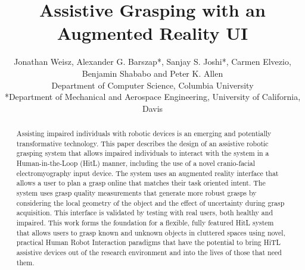\documentclass[10pt, journal]{IEEEtran}
\begin{document}

\title{Assistive Grasping with an Augmented Reality UI}




\author{Jonathan Weisz, Alexander G. Barszap*, Sanjay S. Joshi*, Carmen Elvezio, Benjamin Shababo and Peter K. Allen\\
Department of Computer Science, Columbia University\\
*Department of Mechanical and Aerospace Engineering, University of California, Davis}



\maketitle

\begin{abstract}
Assisting impaired individuals with robotic devices is an emerging and potentially transformative technology.  This paper describes the design of an assistive robotic grasping system that allows impaired individuals to interact with the system in a Human-in-the-Loop (HitL) manner, including the use of a novel cranio-facial electromyography input device. The system uses an augmented reality interface that allows a user to plan a grasp online that matches their task oriented intent. The system uses grasp quality measurements that generate more robust grasps by considering the local geometry of the object and the effect of uncertainty during grasp acquisition. This interface is validated by testing with real users, both healthy and impaired. This work forms the foundation for a flexible, fully featured HitL system that allows users to grasp known and unknown objects in cluttered spaces using novel, practical Human Robot Interaction paradigms that have the potential to bring HiTL assistive devices out of the research environment and into the lives of those that need them. 
\end{abstract}
\end{document}
